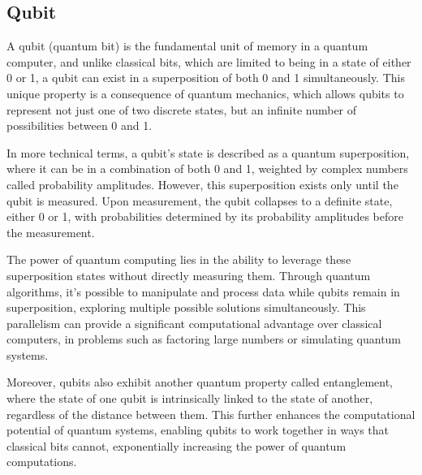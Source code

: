\documentclass{article}
\begin{document}
	\subsection{Qubit}
	A qubit (quantum bit) is the fundamental unit of memory in a quantum computer, and unlike classical bits, which are limited to being in a state of either 0 or 1, a qubit can exist in a superposition of both 0 and 1 simultaneously. This unique property is a consequence of quantum mechanics, which allows qubits to represent not just one of two discrete states, but an infinite number of possibilities between 0 and 1.

	In more technical terms, a qubit's state is described as a quantum superposition, where it can be in a combination of both 0 and 1, weighted by complex numbers called probability amplitudes. However, this superposition exists only until the qubit is measured. Upon measurement, the qubit collapses to a definite state, either 0 or 1, with probabilities determined by its probability amplitudes before the measurement.

	The power of quantum computing lies in the ability to leverage these superposition states without directly measuring them. Through quantum algorithms, it's possible to manipulate and process data while qubits remain in superposition, exploring multiple possible solutions simultaneously. This parallelism can provide a significant computational advantage over classical computers, in problems such as factoring large numbers or simulating quantum systems.

	Moreover, qubits also exhibit another quantum property called entanglement, where the state of one qubit is intrinsically linked to the state of another, regardless of the distance between them. This further enhances the computational potential of quantum systems, enabling qubits to work together in ways that classical bits cannot, exponentially increasing the power of quantum computations.

	
\end{document}
